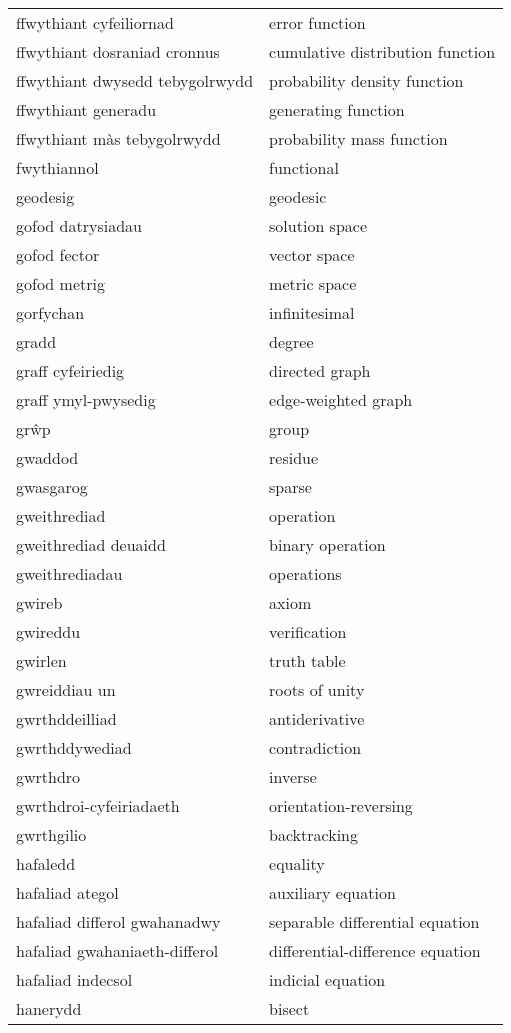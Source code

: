 \begin{supertabular}{p{0.22\textwidth}p{0.22\textwidth}}
ffwythiant cyfeiliornad & error function \\
ffwythiant dosraniad cronnus & cumulative distribution function \\
ffwythiant dwysedd tebygolrwydd & probability density function \\
ffwythiant generadu & generating function \\
ffwythiant màs tebygolrwydd & probability mass function \\
fwythiannol & functional \\
geodesig & geodesic \\
gofod datrysiadau & solution space \\
gofod fector & vector space \\
gofod metrig & metric space \\
gorfychan & infinitesimal \\
gradd & degree \\
graff cyfeiriedig & directed graph \\
graff ymyl-pwysedig & edge-weighted graph \\
grŵp & group \\
gwaddod & residue \\
gwasgarog & sparse \\
gweithrediad & operation \\
gweithrediad deuaidd & binary operation \\
gweithrediadau & operations \\
gwireb & axiom \\
gwireddu & verification \\
gwirlen & truth table \\
gwreiddiau un & roots of unity \\
gwrthddeilliad & antiderivative \\
gwrthddywediad & contradiction \\
gwrthdro & inverse \\
gwrthdroi-cyfeiriadaeth & orientation-reversing \\
gwrthgilio & backtracking \\
hafaledd & equality \\
hafaliad ategol & auxiliary equation \\
hafaliad differol gwahanadwy & separable differential equation \\
hafaliad gwahaniaeth-differol & differential-difference equation \\
hafaliad indecsol & indicial equation \\
hanerydd & bisect \\

\end{supertabular}
